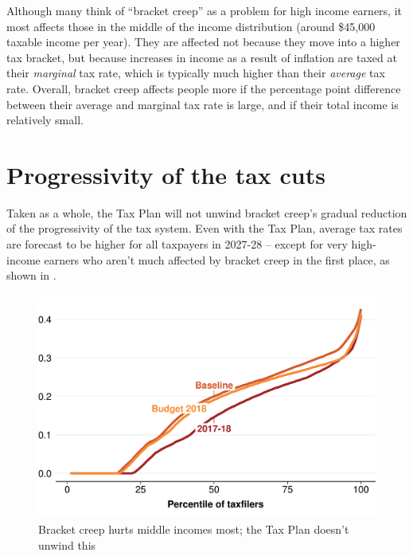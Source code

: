 \documentclass[submission]{grattan}\usepackage[]{graphicx}\usepackage[]{color}
\newenvironment{knitrout}{}{} %
\begin{document}
Although many think of ``bracket creep'' as a problem for high income earners, it most affects those in the middle of the income distribution (around \$45,000 taxable income per year). They are affected not because they move into a higher tax bracket, but because increases in income as a result of inflation are taxed at their \emph{marginal} tax rate, which is typically much higher than their \emph{average} tax rate. Overall, bracket creep affects people more if the percentage point difference between their average and marginal tax rate is large, and if their total income is relatively small.


\section{Progressivity of the tax cuts}\label{sec:progressivity-of-the-tax-cuts}

Taken as a whole, the Tax Plan will not unwind bracket creep's gradual reduction of the progressivity of the tax system. Even with the Tax Plan, average tax rates are forecast to be higher for all taxpayers in 2027-28 -- except for very high-income earners who aren't much affected by bracket creep in the first place, as shown in .

\begin{figure}
\caption{Bracket creep hurts middle incomes most; the Tax Plan doesn't unwind this}\label{fig:bracket-creep-hurts-middle-incomes-most}
\begin{knitrout}
\color{fgcolor}
\includegraphics[width=4.47222in,height=2.92631723826715in]{atlas/fig2-1} 

\end{knitrout}


\end{figure}
\end{document}
